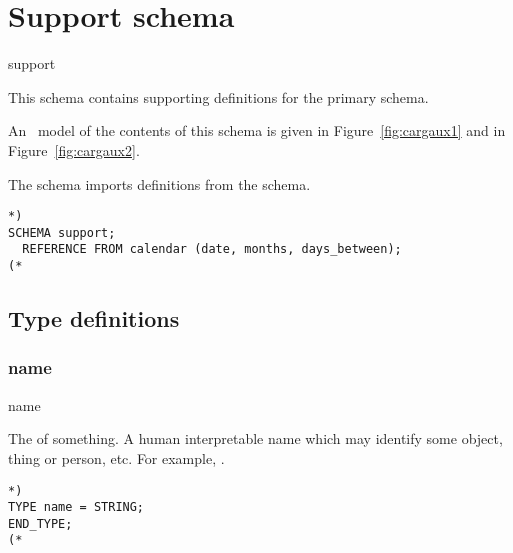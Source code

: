 \documentclass{article}
\providecommand*{\fref}[1]{Figure~\ref{#1}}
\begin{document}
 \section{Support schema}

 \begin{Mnamedesc}{support}
 \begin{Mdesctext}
     This schema contains supporting definitions for the primary
  schema.

     An \ExpressG\ model of the contents of this schema is given in
 \fref{fig:cargaux1} and in \fref{fig:cargaux2}.


    The schema imports definitions from the  schema.
\end{Mdesctext}

\begin{Mexp}
\begin{verbatim}
*)
SCHEMA support;
  REFERENCE FROM calendar (date, months, days_between);
(*
\end{verbatim}
\end{Mexp}
\end{Mnamedesc}

\subsection{Type definitions}

\subsubsection{name}

\begin{Mnamedesc}{name}
\begin{Mdesctext}

The  of something. A human interpretable name which may identify some
object, thing or person, etc. For example, .

\end{Mdesctext}

\begin{Mexp}
\begin{verbatim}
*)
TYPE name = STRING;
END_TYPE;
(*
\end{verbatim}
\end{Mexp}
\end{Mnamedesc}
\end{document}
